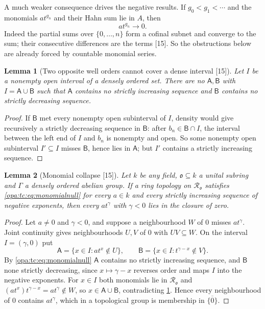 \documentclass[11pt,oneside]{article}
\numberwithin{equation}{section}
\newtheorem{lemma}[lemma]{Lemma}
\theoremstyle{definition}
\theoremstyle{remark}
\newcommand{\oo}{\mathfrak o}
\newcommand{\Ro}{\mathcal R_{\oo}}
\newcommand{\src}[1]{\textup{\textsf{\small[#1]}}}
\begin{document}
A much weaker consequence drives the negative results. If $g_0<g_1<\cdots$ and the monomials
$at^{g_n}$ and their Hahn sum lie in $A$, then
\begin{equation}\label{opa:tc:eq:monomialnull}
 at^{g_n}\longrightarrow0 .
\end{equation}
Indeed the partial sums over $\{0,\dots,n\}$ form a cofinal subnet and converge to the sum; their
consecutive differences are the terms \src{15}. So the obstructions below are already forced by
countable monomial series.

\begin{lemma}[Two opposite well orders cannot cover a dense interval \src{15}]\label{opa:tc:lem:densecover}
Let $I$ be a nonempty open interval of a densely ordered set. There are no $\mathsf A,\mathsf B$ with
$I=\mathsf A\cup\mathsf B$ such that $\mathsf A$ contains no strictly increasing sequence and
$\mathsf B$ contains no strictly decreasing sequence.
\end{lemma}
\begin{proof}
If $\mathsf B$ met every nonempty open subinterval of $I$, density would give recursively a strictly
decreasing sequence in $\mathsf B$: after $b_n\in\mathsf B\cap I$, the interval between the left end
of $I$ and $b_n$ is nonempty and open. So some nonempty open subinterval $I'\subseteq I$ misses
$\mathsf B$, hence lies in $\mathsf A$; but $I'$ contains a strictly increasing sequence.
\end{proof}

\begin{lemma}[Monomial collapse \src{15}]\label{opa:tc:lem:monomialcollapse}
Let $k$ be any field, $\oo\subseteq k$ a unital subring and $\Gamma$ a densely ordered abelian group.
If a ring topology on $\Ro$ satisfies \eqref{opa:tc:eq:monomialnull} for every $a\in k$ and every
strictly increasing sequence of negative exponents, then every $at^\gamma$ with $\gamma<0$ lies in the
closure of zero.
\end{lemma}
\begin{proof}
Let $a\ne0$ and $\gamma<0$, and suppose a neighbourhood $W$ of $0$ misses $at^\gamma$. Joint continuity
gives neighbourhoods $U,V$ of $0$ with $UV\subseteq W$. On the interval $I=(\gamma,0)$ put
\[
 \mathsf A=\{x\in I:at^x\notin U\},\qquad \mathsf B=\{x\in I:t^{\gamma-x}\notin V\}.
\]
By \eqref{opa:tc:eq:monomialnull} $\mathsf A$ contains no strictly increasing sequence, and
$\mathsf B$ none strictly decreasing, since $x\mapsto\gamma-x$ reverses order and maps $I$ into the
negative exponents. For $x\in I$ both monomials lie in $\Ro$ and $(at^x)t^{\gamma-x}=at^\gamma\notin W$,
so $x\in\mathsf A\cup\mathsf B$, contradicting \cref{opa:tc:lem:densecover}. Hence every neighbourhood of
$0$ contains $at^\gamma$, which in a topological group is membership in $\overline{\{0\}}$.
\end{proof}
\end{document}
